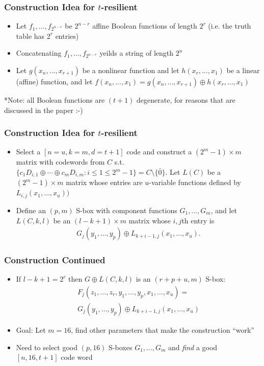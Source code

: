 \documentclass[handout]{beamer}
\begin{document}
\begin{frame}
	\frametitle{Construction Idea for $t$-resilient}
	\begin{itemize}
		\item Let $f_1,\dots,f_{2^{n-r}}$ be $2^{n-r}$ affine Boolean functions of length $2^r$ (i.e. the truth table has $2^r$ entries)
		\item Concatenating $f_1,\dots,f_{2^{n-r}}$ yeilds a string of length $2^n$
		\item Let $g(x_n,\dots,x_{r+1})$ be a nonlinear function and let $h(x_r,\dots,x_1)$ be a linear (affine) function, and let $f(x_n,\dots,x_1) = g(x_n,\dots,x_{r+1})\oplus h(x_r,\dots,x_1)$
	\end{itemize}
	*Note: all Boolean functions are $(t+1)$ degenerate, for reasons that are discussed in the paper :-)
\end{frame}

\begin{frame}
	\frametitle{Construction Idea for $t$-resilient}
	\begin{itemize}
		\item Select a $[n = u, k = m, d = t + 1]$ code and construct a $(2^m - 1)\times m$ matrix with codewords from $C$ s.t. 
		$\{ c_1D_{i,1} \oplus \dotsb \oplus c_mD_{i,m} : i \leq 1 \leq 2^m - 1 \} = C \setminus \{\bar{0}\}$. Let $L(C)$ be a
		$(2^m - 1) \times m$ matrix whose entries are $u$-variable functions defined by $L_{i,j}(x_1,\dots,x_u))$
		\item Define an $(p,m)$ S-box with component functions $G_1,\dots,G_m$, and let $L(C,k,l)$ be an $(l-k+1)\times m$ matrix whose
		$i,j$th entry is
		\begin{align*}
			G_j(y_1,\dots,y_p) \oplus L_{k+i-1,j}(x_1,\dots,x_u).
		\end{align*}
	\end{itemize}
\end{frame}

\begin{frame}
	\frametitle{Construction Continued}
	\begin{itemize}
		\item If $l - k + 1 = 2^r$ then $G \oplus L(C,k,l)$ is an $(r+p+u,m)$ S-box: 
		\begin{align*}
			F_j(z_1,\dots,z_r,y_1,\dots,y_p,x_1,\dots,x_u) = \\
			G_j(y_1,\dots,y_p) \oplus L_{k+i-1,j}(x_1,\dots,x_u)
		\end{align*}
		\item Goal: Let $m = 16$, find other parameters that make the construction ``work''
		\item Need to select good $(p,16)$ S-boxes $G_1,\dots,G_m$ and \emph{find} a good $[n,16,t+1]$ code word
	\end{itemize}
\end{frame}
\end{document}
